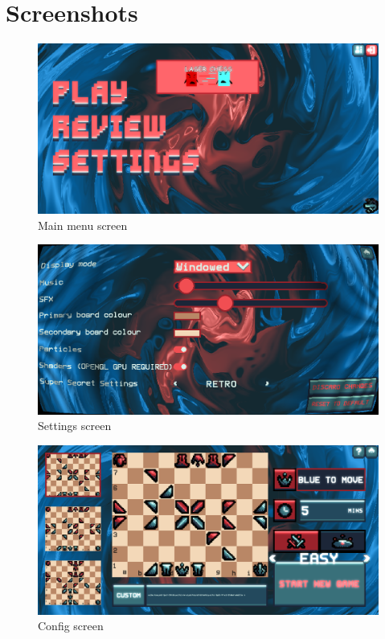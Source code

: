 \documentclass[../main/main.tex]{subfiles}
\begin{document}
\newpage
\chapter{Screenshots}

\begin{figure}[H]
    \centering
    \includegraphics[width=\columnwidth]{../screenshots/assets/menu.png}
    \caption{Main menu screen}
    \label{fig:screenshots-menu}
\end{figure}

\begin{figure}[H]
    \centering
    \includegraphics[width=\columnwidth]{../screenshots/assets/settings.png}
    \caption{Settings screen}
    \label{fig:screenshots-settings}
\end{figure}

\begin{figure}[H]
    \centering
    \includegraphics[width=\columnwidth]{../screenshots/assets/config.png}
    \caption{Config screen}
    \label{fig:screenshots-config}
\end{figure}
\end{document}
